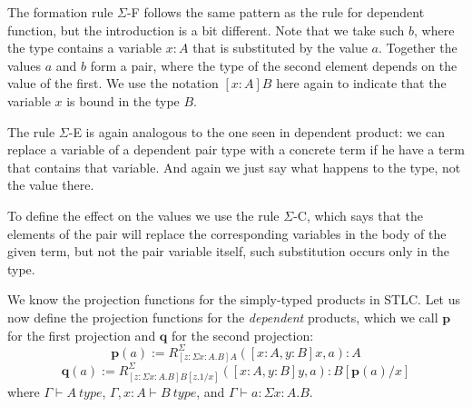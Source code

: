 \begin{definition}
\end{definition}

The formation rule $\Sigma$-F follows the same pattern as the rule for
dependent function, but the introduction is a bit different. Note that we take
such $b$, where the type contains a variable $x : A$ that is substituted by the
value $a$. Together the values $a$ and $b$ form a pair, where the type of the
second element depends on the value of the first. We use the notation $[x : A]
B$ here again to indicate that the variable $x$ is bound in the type $B$.

The rule $\Sigma$-E is again analogous to the one seen in dependent product: we
can replace a variable of a dependent pair type with a concrete term if he
have a term that contains that variable. And again we just say what happens to
the type, not the value there.

To define the effect on the values we use the rule $\Sigma$-C, which says that
the elements of the pair will replace the corresponding variables in the body
of the given term, but not the pair variable itself, such substitution occurs
only in the type.

We know the projection functions for the simply-typed products in STLC. Let us
now define the projection functions for the \emph{dependent} products, which we
call $\mathbf{p}$ for the first projection and $\mathbf{q}$ for the second
projection:
\[
  \mathbf{p}(a) := R^\Sigma_{[z : \Sigma x: A. B]A}([x : A, y: B]x, a) : A
\]
\[
  \mathbf{q}(a) := R^\Sigma_{[z : \Sigma x: A. B]B[z.1/x]}([x : A, y: B]y, a) : B[\mathbf{p}(a)/x]
\]
where $\Gamma \vdash A~type$, $\Gamma, x:A \vdash B~type$, and $\Gamma \vdash a
: \Sigma x: A. B$.

